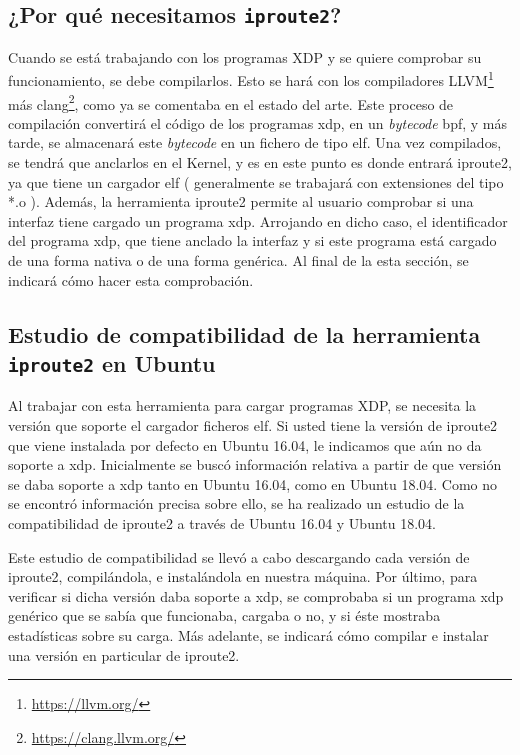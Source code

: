 \subsection{¿Por qué necesitamos \texttt{iproute2}?}

Cuando se está trabajando con los programas XDP y se quiere comprobar su funcionamiento, se debe compilarlos. Esto se hará con los compiladores LLVM\footnote{\url{https://llvm.org/}} más clang\footnote{\url{https://clang.llvm.org/}}, como ya se comentaba en el estado del arte. Este proceso de compilación convertirá el código de los programas \gls{xdp}, en un \textit{bytecode} \gls{bpf}, y más tarde, se almacenará este \textit{bytecode} en un fichero de tipo \gls{elf}. Una vez compilados, se tendrá que anclarlos en el Kernel, y es  en este punto es donde entrará iproute2, ya que tiene un cargador \gls{elf} ( generalmente se trabajará con extensiones del tipo *.o ). \newline
\newline
Además, la herramienta iproute2 permite al usuario comprobar si una interfaz tiene cargado un programa \gls{xdp}. Arrojando en dicho caso, el identificador del programa \gls{xdp}, que tiene anclado la interfaz y si este programa está cargado de una forma nativa o de una forma genérica. Al final de la esta sección, se indicará cómo hacer esta comprobación.

\subsection{Estudio de compatibilidad de la herramienta \texttt{iproute2} en Ubuntu}

Al trabajar con esta herramienta para cargar programas XDP, se necesita  la versión que soporte el cargador ficheros \gls{elf}. Si usted tiene la versión de iproute2 que viene instalada por defecto en Ubuntu 16.04, le indicamos que aún no da soporte a \gls{xdp}. Inicialmente se buscó información relativa a partir de que versión se daba soporte a \gls{xdp} tanto en Ubuntu 16.04, como en Ubuntu 18.04. Como no se encontró información precisa sobre ello, se ha realizado un estudio de la compatibilidad de iproute2 a través de Ubuntu 16.04 y Ubuntu 18.04.\\ 
\par

Este estudio de compatibilidad se llevó a cabo descargando cada versión de iproute2, compilándola, e instalándola en nuestra máquina. Por último, para verificar si dicha versión daba soporte a \gls{xdp}, se comprobaba si un programa \gls{xdp} genérico que se sabía que funcionaba, cargaba o no, y si éste mostraba estadísticas sobre su carga. Más adelante, se indicará cómo compilar e instalar una versión en particular de iproute2.  \\ 
\par

